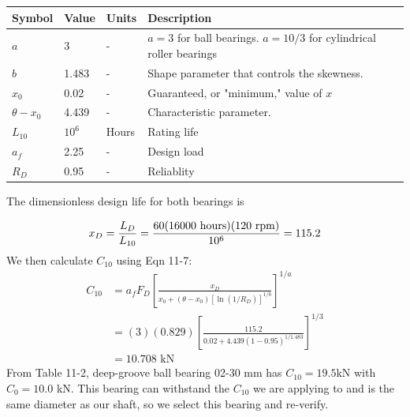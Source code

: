 \documentclass[letterpaper,12pt]{article}
\begin{document}
\begin{center}
\begin{tabular}{ |p{1.5cm}||p{1.2cm}|p{2cm}|p{8cm}|  }
		\hline
		Symbol & Value & Units & Description\\
		\hline
		$a$ & 3 & - & $a = 3$ for ball bearings. $a = 10 / 3$ for cylindrical roller bearings \\
        $b$ & 1.483 & -  & Shape parameter that controls the skewness.\\			
	    $x_0$ & 0.02 & -  & Guaranteed, or "minimum," value of $x$\\
	    $\theta - x _ { 0 }$ & 4.439 & -  & Characteristic parameter.\\
	    $L _ { 10 }$ & $10^{6}$ & Hours  & Rating life\\
	    $a _ { f }$ & 2.25 & -  & Design load\\
	    $R _ { D }$ & 0.95 & -  & Reliablity\\

	    \hline
\end{tabular}
\end{center}
%

The dimensionless design life for both bearings is

\begin{equation}
x _ { D } = \frac { L _ { D } } { L _ { 10 } } = \frac { 60 ( 16000 \text{ hours}) (120 \text{ rpm})} { 10 ^ { 6 } } = 115.2 \notag
\end{equation}
We then calculate $C_{10}$ using Eqn 11-7:
\begin{align*}
   C _ { 10 } &= a _ { f } F _ { D } \left[ \frac { x _ { D } } { x _ { 0 } + \left( \theta - x _ { 0 } \right) \left[ \ln \left( 1 / R _ { D } \right) \right] ^ { 1 / b } } \right] ^ { 1 / a }\\
   &= ( 3 ) ( 0.829 ) \left[ \frac { 115.2 } { 0.02 + 4.439 ( 1 - 0.95 ) ^ { 1 / 1.483 } } \right] ^ { 1 / 3 }\\
   &= 10.708 \text { kN} 
\end{align*}
\noindent From Table 11-2, deep-groove ball bearing 02-30 mm has $C _ { 10 } = 19.5 \mathrm { kN }$ with $ C _ { 0 } = 10.0$ kN. This bearing can withstand the $C_{10}$ we are applying to and is the same diameter as our shaft, so we select this bearing and re-verify.
\end{document}
